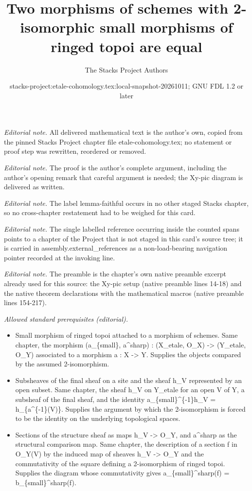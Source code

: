 \documentclass[10pt,a4paper]{amsart}
\title{Two morphisms of schemes with 2-isomorphic small morphisms of ringed topoi are equal}
\author{The Stacks Project Authors}
\date{stacks-project:etale-cohomology.tex:local-snapshot-20261011; GNU FDL 1.2 or later}
\theoremstyle{plain}
\theoremstyle{definition}
\theoremstyle{remark}
\numberwithin{equation}{subsection}
\begin{document}
\maketitle
\noindent\textit{Editorial note.} All delivered mathematical text is the author's own, copied from the pinned Stacks Project chapter file etale-cohomology.tex; no statement or proof step was rewritten, reordered or removed.\par\medskip
\noindent\textit{Editorial note.} The proof is the author's complete argument, including the author's opening remark that careful argument is needed; the Xy-pic diagram is delivered as written.\par\medskip
\noindent\textit{Editorial note.} The label lemma-faithful occurs in no other staged Stacks chapter, so no cross-chapter restatement had to be weighed for this card.\par\medskip
\noindent\textit{Editorial note.} The single labelled reference occurring inside the counted spans points to a chapter of the Project that is not staged in this card's source tree; it is carried in assembly.external\_references as a non-load-bearing navigation pointer recorded at the invoking line.\par\medskip
\noindent\textit{Editorial note.} The preamble is the chapter's own native preamble excerpt already used for this source: the Xy-pic setup (native preamble lines 14-18) and the native theorem declarations with the mathematical macros (native preamble lines 154-217).\par\medskip
\noindent\textit{Allowed standard prerequisites (editorial).}\begin{itemize}
\item Small morphism of ringed topoi attached to a morphism of schemes. Same chapter, the morphism (a\_\{small\}, a\textasciicircum{}sharp) : (X\_etale, O\_X) -> (Y\_etale, O\_Y) associated to a morphism a : X -> Y. Supplies the objects compared by the assumed 2-isomorphism.
\item Subsheaves of the final sheaf on a site and the sheaf h\_V represented by an open subset. Same chapter, the sheaf h\_V on Y\_etale for an open V of Y, a subsheaf of the final sheaf, and the identity a\_\{small\}\textasciicircum{}\{-1\}h\_V = h\_\{a\textasciicircum{}\{-1\}(V)\}. Supplies the argument by which the 2-isomorphism is forced to be the identity on the underlying topological spaces.
\item Sections of the structure sheaf as maps h\_V -> O\_Y, and a\textasciicircum{}sharp as the structural comparison map. Same chapter, the description of a section f in O\_Y(V) by the induced map of sheaves h\_V -> O\_Y and the commutativity of the square defining a 2-isomorphism of ringed topoi. Supplies the diagram whose commutativity gives a\_\{small\}\textasciicircum{}sharp(f) = b\_\{small\}\textasciicircum{}sharp(f).
\end{itemize}\medskip
\end{document}
